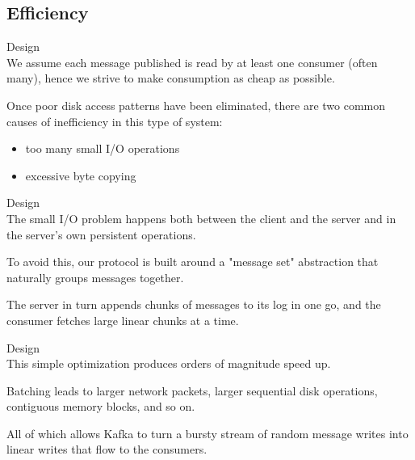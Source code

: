 \subsection{Efficiency}
\begin{frame}[plain,t]{Design} %
     \\
    \vspace{2ex}
    We assume each message published is read by at least one consumer (often many), hence we strive to make consumption as cheap as possible.
    
    \vspace{2ex}
    Once poor disk access patterns have been eliminated, there are two common causes of inefficiency in this type of system:%
    \begin{itemize}
        \item too many small I/O operations
        \item excessive byte copying
    \end{itemize}
    
    
    
\end{frame}
\begin{frame}[plain,t]{Design} %
     \\
    \vspace{2ex}
    The small I/O problem happens both between the client and the server and in the server's own persistent operations.
    
    \vspace{2ex}
    To avoid this, our protocol is built around a "message set" abstraction that naturally groups messages together. 
    
   
    \vspace{2ex}
    The server in turn appends chunks of messages to its log in one go, and the consumer fetches large linear chunks at a time.
    
    
    
    
\end{frame}
\begin{frame}[plain,t]{Design} %
     \\
    \vspace{2ex}
    This simple optimization produces orders of magnitude speed up. 
    
    \vspace{2ex}
    Batching leads to larger network packets, larger sequential disk operations, contiguous memory blocks, and so on.
    
    \vspace{2ex}
    All of which allows Kafka to turn a bursty stream of random message writes into linear writes that flow to the consumers.
    
    
    
    
\end{frame}
